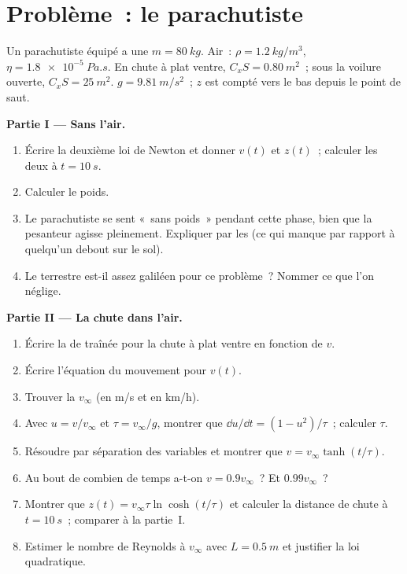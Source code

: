 \section{Problème~: le parachutiste}

\begin{problem}
\label{pb:b1:newton-dynamics:1}
Un parachutiste équipé a une  $m = \qty{80}{kg}$. Air~:
$\rho = \qty{1.2}{kg/m^3}$, $\eta = \qty{1.8e-5}{Pa.s}$. En chute à plat
ventre, $C_xS = \qty{0.80}{m^2}$~; sous la voilure ouverte, $C_xS =
\qty{25}{m^2}$. $g = \qty{9.81}{m/s^2}$~; $z$ est compté vers le bas
depuis le point de saut.

\medskip
\noindent\textbf{Partie I --- Sans l'air.}
\begin{enumerate}
  \item Écrire la deuxième loi de Newton et donner $v(t)$ et $z(t)$~;
        calculer les deux à $t = \qty{10}{s}$.
  \item Calculer le poids.
  \item Le parachutiste se sent «~sans poids~» pendant cette phase, bien
        que la pesanteur agisse pleinement. Expliquer par les  (ce
        qui manque par rapport à quelqu'un debout sur le sol).
  \item Le  terrestre est-il assez galiléen pour ce problème~?
        Nommer ce que l'on néglige.
\end{enumerate}

\medskip
\noindent\textbf{Partie II --- La chute dans l'air.}
\begin{enumerate}[resume]
  \item Écrire la  de traînée pour la chute à plat ventre en
        fonction de $v$.
  \item Écrire l'équation du mouvement pour $v(t)$.
  \item Trouver la  $v_\infty$ (en \unit{m/s} et en
        \unit{km/h}).
  \item Avec $u = v/v_\infty$ et $\tau = v_\infty/g$, montrer que
        $\dd u/\dd t = (1 - u^2)/\tau$~; calculer $\tau$.
  \item Résoudre par séparation des variables et montrer que
        $v = v_\infty\tanh(t/\tau)$.
  \item Au bout de combien de temps a-t-on $v = 0.9v_\infty$~? Et
        $0.99v_\infty$~?
  \item Montrer que $z(t) = v_\infty\tau\ln\cosh(t/\tau)$ et calculer la
        distance de chute à $t = \qty{10}{s}$~; comparer à la partie~I.
  \item Estimer le nombre de Reynolds à $v_\infty$ avec $L = \qty{0.5}{m}$
        et justifier la loi quadratique.
\end{enumerate}


\end{problem}
